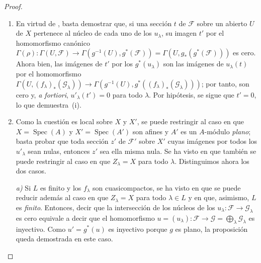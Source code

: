 \begin{proof}

\begin{enumerate}[label=(\roman*)]
  \item En virtud de , basta demostrar que, si una sección $t$ de $\mathcal F$ sobre un abierto $U$ de $X$ pertenece al núcleo de cada uno de los $u_\lambda$, su imagen $t'$ por el homomorfismo canónico $\Gamma(\rho):\Gamma(U,\mathcal F)\longrightarrow
  \Gamma(g^{-1}(U),g^*(\mathcal F))
  =\Gamma(U,g_*(g^*(\mathcal F)))$ es cero.
  Ahora bien, las imágenes de $t'$ por los $g^*(u_\lambda)$ son las imágenes de $u_\lambda(t)$ por el homomorfismo $\Gamma(U,(f_\lambda)_*(\mathcal G_\lambda))\longrightarrow
  \Gamma(g^{-1}(U),g^*((f_\lambda)_*(\mathcal G_\lambda)))$; por tanto, son cero y, \emph{a fortiori}, $u'_\lambda(t')=0$ para todo $\lambda$. Por hipótesis, se sigue que $t'=0$, lo que demuestra~(i).

  \item Como la cuestión es local sobre $X$ y $X'$, se puede restringir al caso en que $X=\operatorname{Spec}(A)$ y $X'=\operatorname{Spec}(A')$ son afines y $A'$ es un $A$-módulo \emph{plano}; basta probar que toda sección $z'$ de $\mathcal F'$ sobre $X'$ cuyas imágenes por todos los $u'_\lambda$ sean nulas, entonces $z'$ sea ella misma nula.
  Se ha visto en  que también se puede restringir al caso en que $Z_\lambda=X$ para todo $\lambda$.
  Distinguimos ahora los dos casos.
  \medskip

  \emph{a)} Si $L$ es finito y los $f_\lambda$ son cuasicompactos, se ha visto en  que se puede reducir además al caso en que $Z_\lambda=X$ para todo $\lambda\in L$ y en que, asimismo, $L$ es \emph{finito}.
  Entonces, decir que la intersección de los núcleos de los $u_\lambda:\mathcal F\to\mathcal G_\lambda$ es cero equivale a decir que el homomorfismo $u=(u_\lambda):\mathcal F\to\mathcal G=\bigoplus_\lambda\mathcal G_\lambda$ es inyectivo.
  Como $u'=g^*(u)$ es inyectivo porque $g$ es plano, la proposición queda demostrada en este caso.


\end{enumerate}
\end{proof}
